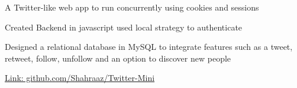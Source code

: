 \documentclass[]{deedy-resume-openfont}
\begin{document}
\begin{minipage}[t]{0.66\textwidth}

\begin{tightemize}
\item A Twitter-like web app to run concurrently using cookies and sessions
\item Created Backend in javascript used local strategy to authenticate 
\item Designed a relational database in MySQL to integrate features such as a tweet, retweet, follow, unfollow and an option to discover new people
\item \href{https://github.com/Shahraaz/Twitter-Mini}{Link: github.com/Shahraaz/Twitter-Mini}
\end{tightemize}




\end{minipage} 
\end{document}
